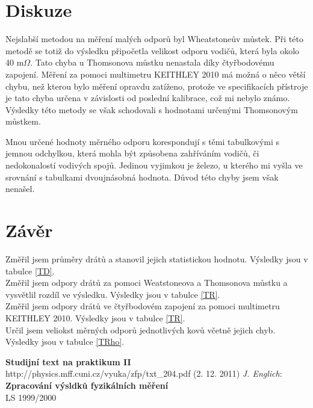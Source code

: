 \documentclass[a4paper,12pt]{article}
\begin{document}
\section{Diskuze}
Nejslabší metodou na měření malých odporů byl Wheatstoneův můstek. Při této metodě se totiž do výsledku připočetla velikost odporu vodičů, která byla okolo 40 m$\Omega$. 
Tato chyba u Thomsonova můstku nenastala díky čtyřbodovému zapojení. Měření za pomoci multimetru KEITHLEY 2010 má možná o něco větší chybu, než kterou bylo měření opravdu 
zatíženo, protože ve specifikacích přístroje je tato chyba určena v závislosti od poslední kalibrace, což mi nebylo známo. Výsledky této metody se však schodovali s hodnotami 
určenými Thomsonovým můstkem.

Mnou určené hodnoty měrného odporu korespondují s těmi tabulkovými s jemnou odchylkou, která mohla být způsobena zahříváním vodičů, či nedokonalostí vodivých spojů. Jedinou 
vyjimkou je železo, u  kterého mi vyšla ve srovnání s tabulkami dvoujnásobná hodnota. Důvod této chyby jsem však nenašel.

\section{Závěr}
\noindent
Změřil jsem průměry drátů a stanovil jejich statistickou hodnotu. Výsledky jsou v tabulce \ref{TD}. \\
Změřil jsem odpory drátů za pomoci Weatstoneova a Thomsonova můstku a vysvětlil rozdíl ve výsledku. Výsledky jsou v tabulce \ref{TR}. \\
Změřil jsem odpory drátů ve čtyřbodovém zapojení za pomoci multimetru KEITHLEY 2010. Výsledky jsou v tabulce \ref{TR}. \\
Určil jsem veliokst měrných odporů jednotlivých kovů včetně jejich chyb. Výsledky jsou v tabulce \ref{TRho}.

\begin{thebibliography}{5}
	 \textbf{Studijní text na praktikum II} \\http://physics.mff.cuni.cz/vyuka/zfp/txt\_204.pdf (2. 12. 2011)
     \emph{J. Englich}: \textbf{Zpracování výsldků fyzikálních měření} \\ LS 1999/2000
\end{thebibliography}
\end{document}
